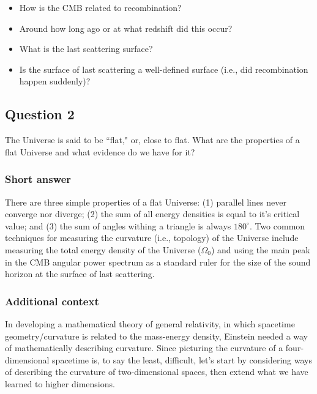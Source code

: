 \documentclass[a4paper,11pt]{article}
\begin{document}
\begin{itemize}
    \item How is the CMB related to recombination?
    \item Around how long ago or at what redshift did this occur?
    \item What is the last scattering surface?
    \item Is the surface of last scattering a well-defined surface (i.e., did recombination happen suddenly)?
\end{itemize}

%
%

\newpage
\subsection{Question 2}

The Universe is said to be ``flat," or, close to flat. What are the properties of a flat Universe and what evidence do we have for it?

\subsubsection{Short answer}

There are three simple properties of a flat Universe: (1) parallel lines never converge nor diverge; (2) the sum of all energy densities is equal to it's critical value; and (3) the sum of angles withing a triangle is always $180^\circ$. Two common techniques for measuring the curvature (i.e., topology) of the Universe include measuring the total energy density of the Universe ($\Omega_0$) and using the main peak in the CMB angular power spectrum as a standard ruler for the size of the sound horizon at the surface of last scattering.

\subsubsection{Additional context}

In developing a mathematical theory of general relativity, in which spacetime geometry/curvature is related to the mass-energy density, Einstein needed a way of mathematically describing curvature. Since picturing the curvature of a four-dimensional spacetime is, to say the least, difficult, let's start by considering ways of describing the curvature of two-dimensional spaces, then extend what we have learned to higher dimensions.
\end{document}
